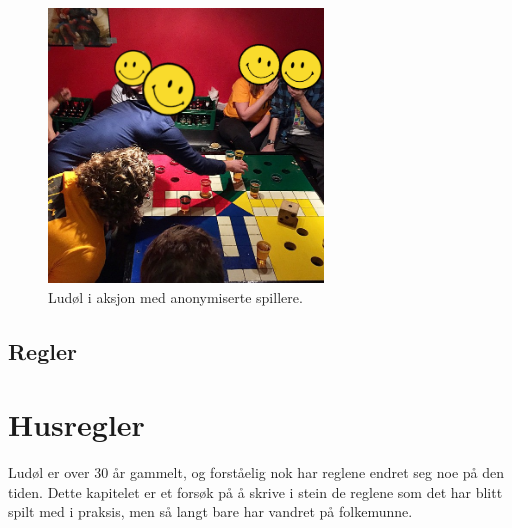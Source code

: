 \documentclass[10pt,a4paper,norsk,openany]{book}
\begin{document}
\begin{figure}[htbp!]
  \centering
  \includegraphics[width=0.65\textwidth]{ludol-live} 
  \caption{Ludøl i aksjon med anonymiserte spillere.}
  \label{fig:ludol-live}
\end{figure}

\newpage

\section{Regler} 




\chapter{Husregler}

Ludøl er over 30 år gammelt, og forståelig nok har reglene endret seg noe på den
tiden. Dette kapitelet er et forsøk på å skrive i stein de reglene som det har
blitt spilt med i praksis, men så langt bare har vandret på folkemunne.
\end{document}

